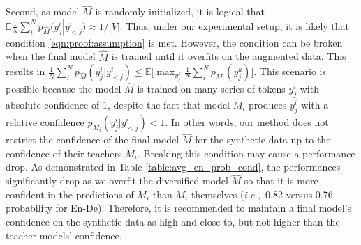 \documentclass{article}
\newcommand{\E}{\mathbb{E}}
\newcommand{\ie}{{\em i.e.,}\xspace}
\begin{document}
Second, as model $\hat{M}$ is randomly initialized, it is logical that $\E\frac{1}{N}\sum_i^N p_{\hat{M}}(y^i_j|y_{<j}^i) \approx 1/|V|$. Thus, under our experimental setup, it is likely that condition \ref{eqn:proof:assumption} is met. However, the condition can be broken when the final model $\hat{M}$ is trained until it overfits on the augmented data. This results in $\frac{1}{N}\sum_i^N p_{\hat{M}}(y^i_j|y_{<j}^i) \leq \E\Big[\max_{y_j^k}\frac{1}{N}\sum_i^N p_{M_i}(y^k_j)\Big]$. This scenario is possible because the model $\hat{M}$ is trained on many series of tokens $y_j^i$ with absolute confidence of $1$, despite the fact that model $M_i$ produces $y_j^i$ with a relative confidence $p_{M_i}(y_j^i|y_{<j}^i) < 1$. In other words, our method does not restrict the confidence of the final model $\hat{M}$ for the synthetic data up to the confidence of their teachers $M_i$. Breaking this condition may cause a performance drop. As demonstrated in Table \ref{table:avg_en_prob_cond}, the performances significantly drop as we overfit the diversified model $\hat{M}$ so that it is more confident in the predictions of $M_i$ than $M_i$ themselves (\ie\ 0.82 versus 0.76 probability for En-De). Therefore, it is recommended to maintain a final model's confidence on the synthetic data as high and close to, but not higher than the teacher models' confidence.
\end{document}
